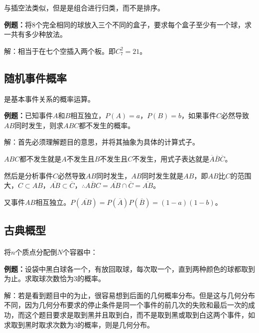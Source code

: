 与插空法类似，但是是组合进行归类，而不是排序。

\textbf{例题：}将8个完全相同的球放入三个不同的盒子，要求每个盒子至少有一个球，求一共有多少种放法。

解：相当于在七个空插入两个板。即$C_7^2=21$。

\subsection{随机事件概率}

是基本事件关系的概率运算。

\textbf{例题：}已知事件$A$和$B$相互独立，$P(A)=a$，$P(B)=b$，如果事件$C$必然导致$AB$同时发生，则求$ABC$都不发生的概率。

解：首先必须理解题目的意思，并将其抽象为具体的计算式子。

$ABC$都不发生就是$A$不发生且$B$不发生且$C$不发生，用式子表达就是$\overline{A}\overline{B}\overline{C}$。

然后是分析事件$C$必然导致$AB$同时发生，$AB$同时发生就是$AB$，即$AB$比$C$的范围大，$C\subset AB$，$\overline{AB}\subset\overline{C}$，$\therefore\overline{ABC}=\overline{AB}\cap\overline{C}=\overline{AB}$。

又事件$AB$相互独立。$P(\overline{AB})=P(\overline{A})P(\overline{B})=(1-a)(1-b)$。

\subsection{古典概型}

\paragraph{}

\paragraph{}

将$n$个质点分配倒$N$个容器中：

\textbf{例题：}设袋中黑白球各一个，有放回取球，每次取一个，直到两种颜色的球都取到为止。求取球次数恰为3的概率。

解：若是看到题目中的为止，很容易想到后面的几何概率分布。但是这与几何分布不同，因为几何分布要求的停止条件是同一个事件的前几次的失败和最后一次的成功，而这个题目要求是取到黑并且取到白，而不是取到黑或取到白这两个事件，如求取到黑时取求次数为3的概率，则是几何分布。


